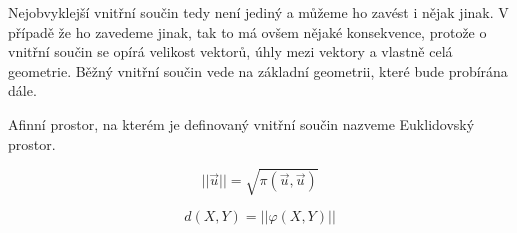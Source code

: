 Nejobvyklejší vnitřní součin tedy není jediný a můžeme ho zavést i nějak jinak. V případě že ho zavedeme jinak,
tak to má ovšem nějaké konsekvence, protože o vnitřní součin se opírá velikost vektorů, úhly mezi vektory a
vlastně celá geometrie. Běžný vnitřní součin vede na základní  geometrii, které bude probírána
dále.

\begin{definition}
    Afinní prostor, na kterém je definovaný vnitřní součin nazveme Euklidovský prostor.
\end{definition}

\begin{definition}
    $$||\vec{u}|| = \sqrt{\pi(\vec{u}, \vec{u})}$$
\end{definition}

\begin{definition}
    $$d(X, Y) = ||\varphi(X, Y)||$$
\end{definition}